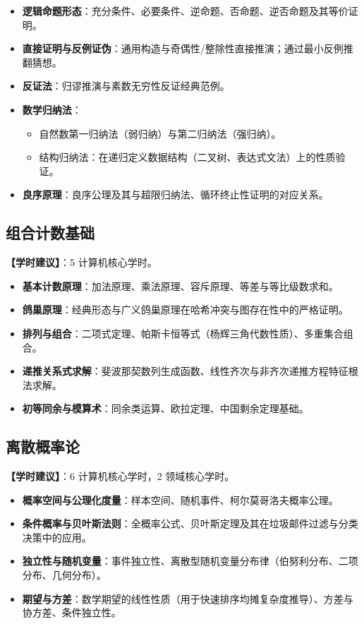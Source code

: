 \begin{itemize}
    \item \textbf{逻辑命题形态}：充分条件、必要条件、逆命题、否命题、逆否命题及其等价证明。
    \item \textbf{直接证明与反例证伪}：通用构造与奇偶性/整除性直接推演；通过最小反例推翻猜想。
    \item \textbf{反证法}：归谬推演与素数无穷性反证经典范例。
    \item \textbf{数学归纳法}：
    \begin{itemize}
        \item 自然数第一归纳法（弱归纳）与第二归纳法（强归纳）。
        \item 结构归纳法：在递归定义数据结构（二叉树、表达式文法）上的性质验证。
    \end{itemize}
    \item \textbf{良序原理}：良序公理及其与超限归纳法、循环终止性证明的对应关系。
\end{itemize}

\subsection{组合计数基础}
\textbf{【学时建议】}：5 计算机核心学时。

\begin{itemize}
    \item \textbf{基本计数原理}：加法原理、乘法原理、容斥原理、等差与等比级数求和。
    \item \textbf{鸽巢原理}：经典形态与广义鸽巢原理在哈希冲突与图存在性中的严格证明。
    \item \textbf{排列与组合}：二项式定理、帕斯卡恒等式（杨辉三角代数性质）、多重集合组合。
    \item \textbf{递推关系式求解}：斐波那契数列生成函数、线性齐次与非齐次递推方程特征根法求解。
    \item \textbf{初等同余与模算术}：同余类运算、欧拉定理、中国剩余定理基础。
\end{itemize}

\subsection{离散概率论}
\textbf{【学时建议】}：6 计算机核心学时，2 领域核心学时。

\begin{itemize}
    \item \textbf{概率空间与公理化度量}：样本空间、随机事件、柯尔莫哥洛夫概率公理。
    \item \textbf{条件概率与贝叶斯法则}：全概率公式、贝叶斯定理及其在垃圾邮件过滤与分类决策中的应用。
    \item \textbf{独立性与随机变量}：事件独立性、离散型随机变量分布律（伯努利分布、二项分布、几何分布）。
    \item \textbf{期望与方差}：数学期望的线性性质（用于快速排序均摊复杂度推导）、方差与协方差、条件独立性。
\end{itemize}

